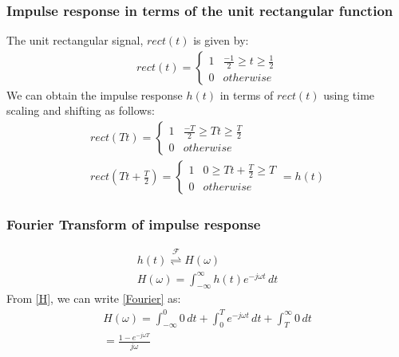 \documentclass{beamer}
\providecommand{\fourier}{\overset{\mathcal{F}}{ \rightleftharpoons}}
\begin{document}
\begin{frame}
    \frametitle {Impulse response in terms of the unit rectangular function}
    \begin{flushleft}
    The unit rectangular signal, $rect(t)$ is given by:
\begin{align}
    rect(t) = 
    \begin{cases}
    1 & \frac{-1}{2} \geq t \geq \frac{1}{2} \\
    0 & otherwise
    \end{cases}
\end{align}
We can obtain the impulse response $h(t)$ in terms of $rect(t)$ using time scaling and shifting as follows:
\begin{align}
    rect(Tt) = 
    \begin{cases}
    1 & \frac{-T}{2} \geq Tt \geq \frac{T}{2} \\
    0 & otherwise
    \end{cases}\\
    rect(Tt + \frac{T}{2}) = 
    \begin{cases}
    1 & 0 \geq Tt + \frac{T}{2} \geq T \\
    0 & otherwise
    \end{cases}
     = h(t)
\end{align}
    \end{flushleft}
\end{frame}
\begin{frame}
    \frametitle{Fourier Transform of impulse response}
    \begin{flushleft}
    \begin{align}
    h(t)\fourier H(\omega)\\
    H(\omega) = \int_{-\infty}^\infty h(t)e^{-j\omega t}\,dt
    \label{Fourier}
\end{align}
From \eqref{H}, we can write \eqref{Fourier} as:
\begin{align}
    H(\omega) = \int_{-\infty}^0 0\,dt + \int_0^T e^{-j\omega t}\,dt + \int_T^\infty 0\,dt\\
     = \frac{1 - e^{-j\omega T}}{j\omega}\\
      \end{align}
    \end{flushleft}
\end{frame}
\end{document}
